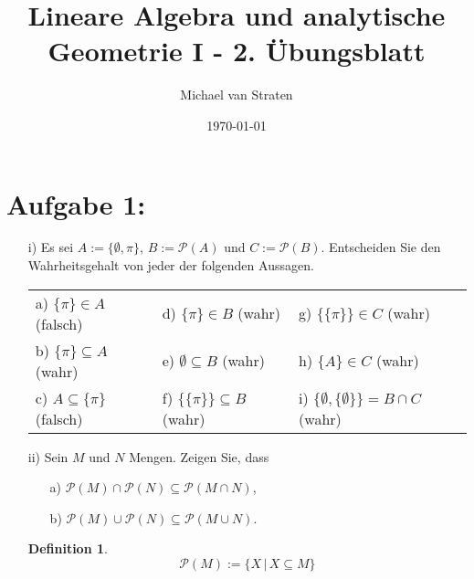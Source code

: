 \documentclass{exam}
\title{Lineare Algebra und analytische Geometrie I - 2. Übungsblatt}
\author{Michael van Straten}
\date{\today}
\newtheorem{definition}{Definition}
\begin{document}
\maketitle

\section*{Aufgabe 1:}
\begin{enumerate}
    \item [i)] Es sei $A := \{\emptyset, \pi\}$, $B := \mathcal{P}(A)$ und $C := \mathcal{P}(B)$. Entscheiden Sie den Wahrheitsgehalt von jeder der folgenden Aussagen. \newline
          \renewcommand{\arraystretch}{1.5}
          \begin{tabularx}{\textwidth}{ X X X }
              a) $\{\pi\} \in A$ (falsch)       & d) $\{\pi\} \in B$ (wahr)           & g) $\{\{ \pi \}\} \in C$ (wahr)                     \\
              b) $\{\pi\} \subseteq A$ (wahr)   & e) $\emptyset \subseteq B$ (wahr)   & h) $\{A\} \in C$ (wahr)                             \\
              c) $A \subseteq \{\pi\}$ (falsch) & f) $\{\{\pi\}\} \subseteq B$ (wahr) & i) $\{\emptyset, \{\emptyset\}\} = B \cap C$ (wahr)
          \end{tabularx}

    \item [ii)] Sein $M$ und $N$ Mengen. Zeigen Sie, dass \begin{enumerate}
              \item [a)] $\mathcal{P}(M) \cap \mathcal{P}(N) \subseteq \mathcal{P}(M \cap N)$,
              \item [b)] $\mathcal{P}(M) \cup \mathcal{P}(N) \subseteq \mathcal{P}(M \cup N)$.
          \end{enumerate}
          \begin{definition}
              \begin{displaymath}
                  \mathcal{P}(M) := \{X\,|\,X \subseteq M\}
              \end{displaymath}
          \end{definition}


\end{enumerate}
\end{document}
